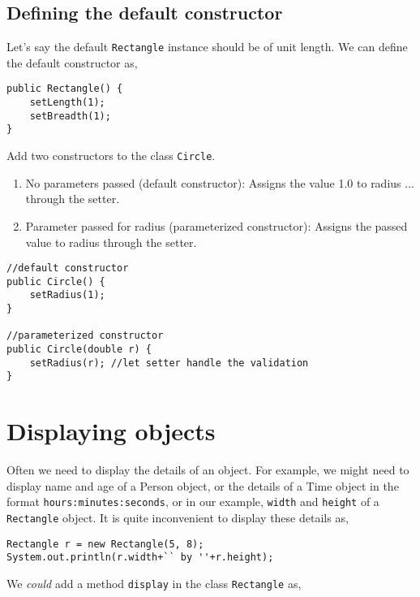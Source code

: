 \subsection{Defining the default constructor}

Let's say the default \texttt{Rectangle} instance should be of unit length. We can define the default constructor as,
\begin{lstlisting}
public Rectangle() {
	setLength(1);
	setBreadth(1);
}
\end{lstlisting}

\begin{exercise}
Add two constructors to the class \texttt{Circle}.
\begin{enumerate}
\item No parameters passed (default constructor): Assigns the value 1.0 to radius ... through the setter.
\item Parameter passed for radius (parameterized constructor): Assigns the passed value to radius through the setter.
\end{enumerate}
\end{exercise}
\begin{answer} \begin{lstlisting}
//default constructor
public Circle() {
	setRadius(1);
}

//parameterized constructor
public Circle(double r) {
	setRadius(r); //let setter handle the validation
}
\end{lstlisting} \end{answer}


\section{Displaying objects}

Often we need to display the details of an object. For example, we might need to display name and age of a Person object, or the details of a Time object in the format \texttt{hours:minutes:seconds}, or in our example, \texttt{width} and \texttt{height} of a \texttt{Rectangle} object. It is quite inconvenient to display these details as,

\begin{lstlisting}
Rectangle r = new Rectangle(5, 8);
System.out.println(r.width+`` by ''+r.height);
\end{lstlisting}

We \emph{could} add a method \texttt{display} in the class \texttt{Rectangle} as,

